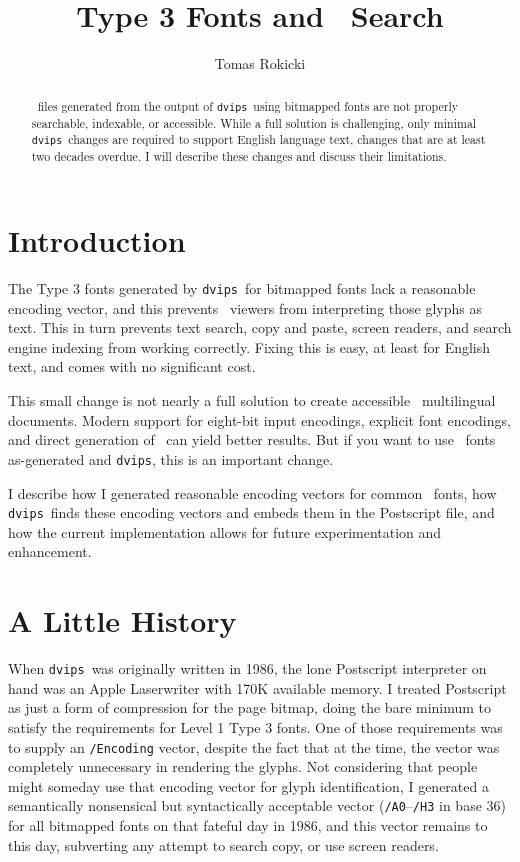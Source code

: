 \documentclass{ltugboat}
\title{Type 3 Fonts and \PDF\ Search}
\author{Tomas Rokicki}
\def\PDF{\acro{PDF}}
\def\dvips{\texttt{dvips}}
\begin{document}
\maketitle

\begin{abstract}
\PDF\ files generated from the output of \dvips\ using
bitmapped fonts are not properly searchable,
indexable, or accessible.  While a full solution is challenging,
only minimal \dvips\ changes are required to support
English language text, changes that are at least two decades overdue.
I will describe these changes and discuss their limitations.
\end{abstract}

\section{Introduction}

The Type 3 fonts generated by \dvips\ for bitmapped fonts
lack a reasonable encoding vector, and this prevents \PDF\ 
viewers from interpreting those glyphs as text.  This in turn
prevents text search, copy and paste, screen readers, and
search engine indexing from working correctly.  Fixing this is
easy, at least for English text, and comes with no significant
cost.

This small change is not nearly a full solution to create
accessible \PDF\ multilingual documents.  Modern support
for eight-bit input encodings\cite{ENC}, explicit font encodings\cite{MMAP},
and direct generation of \PDF\ can yield better results.
But if you want to use \MF\ fonts as-generated and \dvips,
this is an important change.

I describe how I generated reasonable encoding vectors
for common \MF\ fonts, how \dvips\ finds these
encoding vectors and embeds them in the Postscript file, and
how the current implementation allows for future
experimentation and enhancement.

\section{A Little History}

When \dvips\ was originally written in 1986, the lone
Postscript interpreter on hand was an Apple Laserwriter with
170K available memory.  I treated Postscript as just a form of
compression for the page bitmap, doing the bare minimum to
satisfy the requirements for Level 1 Type 3 fonts.  One of
those requirements was to supply an \texttt{/Encoding} vector,
despite the fact that at the time, the vector was completely
unnecessary in rendering the glyphs.  Not considering that people
might someday use that encoding vector for glyph identification,
I generated a semantically nonsensical but syntactically acceptable
vector (\texttt{/A0}--\texttt{/H3} in base 36) for all bitmapped
fonts on that fateful day in 1986, and
this vector remains to this day, subverting any attempt to search
copy, or use screen readers.
\end{document}
